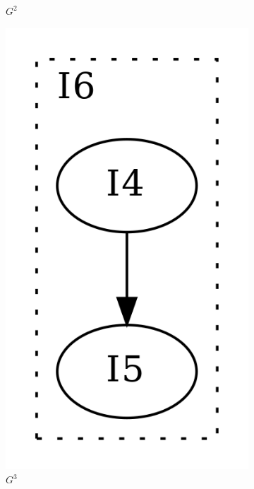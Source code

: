 \begin{figure}[htbp]
\begin{subfigure}[b]{0.12\textwidth}
		\caption{$G^2$}
	\end{subfigure}
	\qquad
	\begin{subfigure}[b]{0.12\textwidth}
		\centering
		\includegraphics[width=\textwidth]{inc/3_background/interval_method/derived_sequence_of_graphs/G_3.png}
		\caption{$G^3$}
	\end{subfigure}
	\qquad
	\begin{subfigure}[b]{0.08\textwidth}

\end{subfigure}
\end{figure}
